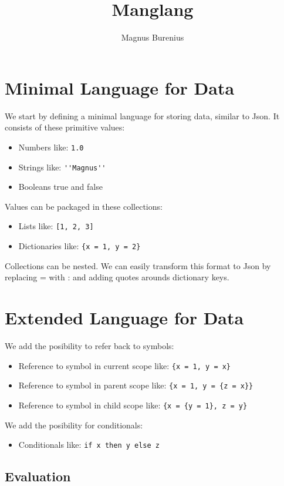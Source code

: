 \documentclass[a4paper,12pt]{article}
\title{Manglang}
\author{Magnus Burenius}
\begin{document}
\maketitle

\section{Minimal Language for Data}

We start by defining a minimal language for storing data, similar to Json. It consists of these primitive values:
\begin{itemize}
\item Numbers like: \lstinline|1.0|
\item Strings like: \lstinline|''Magnus''|
\item Booleans true and false
\end{itemize}
Values can be packaged in these collections:
\begin{itemize}
\item Lists like: \lstinline|[1, 2, 3]|
\item Dictionaries like: \lstinline|{x = 1, y = 2}|
\end{itemize}
Collections can be nested. We can easily transform this format to Json by replacing = with : and adding quotes arounds dictionary keys.

\section{Extended Language for Data}

We add the posibility to refer back to symbols:
\begin{itemize}
\item Reference to symbol in current scope like: \lstinline|{x = 1, y = x}|
\item Reference to symbol in parent scope like:  \lstinline|{x = 1, y = {z = x}}|
\item Reference to symbol in child scope like:  \lstinline|{x = {y = 1}, z = y}|
\end{itemize}
We add the posibility for conditionals:
\begin{itemize}
\item Conditionals like: \lstinline|if x then y else z|
\end{itemize}

\subsection{Evaluation}
\end{document}
